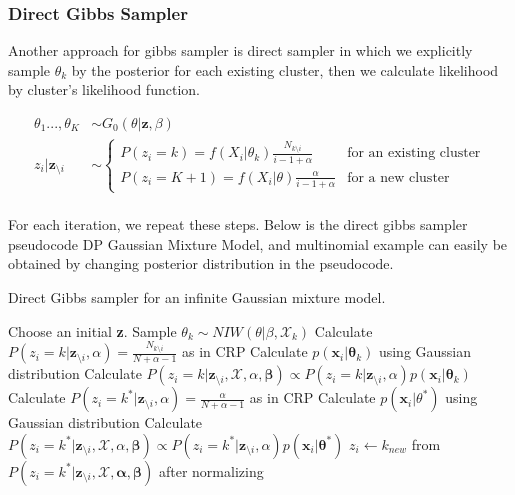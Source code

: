 \documentclass[a4paper]{article}
\begin{document}
\subsubsection{Direct Gibbs Sampler}

Another approach for gibbs sampler is direct sampler in which we
explicitly sample \(\theta_k\) by the posterior for each existing
cluster, then we calculate likelihood by cluster's likelihood function.

\begin{align*}
\theta_1...,\theta_K&\sim G_0(\theta|\boldsymbol z, \beta) \\
z_i|\boldsymbol z_{\setminus i} &\sim \begin{cases}
P(z_i=k)= f(X_i|\theta_{k})\frac{N_{k\setminus i}}{i-1+\alpha} & \text{for an existing cluster} \\
P(z_i=K+1)= f(X_i|\theta)\frac{\alpha}{i-1+\alpha} & \text{for a new cluster}
\end{cases}\\
\end{align*}

For each iteration, we repeat these steps. Below is the direct gibbs
sampler pseudocode DP Gaussian Mixture Model, and multinomial example
can easily be obtained by changing posterior distribution in the
pseudocode.


\begin{algorithm}
  \caption{Direct Gibbs sampler for an infinite Gaussian mixture model.}\label{directgibbs}
  \begin{algorithmic}[1]
    
  \State Choose an initial \textbf{z}.
   
     
            \State Sample $\theta_k \sim NIW(\theta|\beta,\mathcal{X}_{k})$ 
    \EndFor
         
            \State Calculate $P(z_i = k | \mathbf{z}_{\setminus i},\alpha) = \frac{N_{k\setminus i}}{N+\alpha-1}$ as in CRP
            \State Calculate $p(\mathbf{x}_i|\mathbf{\theta}_k)$ using Gaussian distribution
            \State Calculate $P(z_i = k | \mathbf{z}_{\setminus i},\mathcal{X},\alpha,\mathbf{\beta}) \propto P(z_i = k | \mathbf{z}_{\setminus i},\alpha)p(\mathbf{x}_i|\mathbf{\theta}_k)$
        \EndFor
        \State Calculate $P(z_i = k^* | \mathbf{z}_{\setminus i},\alpha) = \frac{\alpha}{N+\alpha-1}$ as in CRP 
        \State Calculate $p(\mathbf{x}_i|\theta^*)$ using Gaussian distribution
        \State Calculate $P(z_i = k^* | \mathbf{z}_{\setminus i},\mathcal{X},\alpha, \mathbf{\beta}) \propto P(z_i = k^* | \mathbf{z}_{\setminus i},\alpha)p(\mathbf{x}_i|\mathbf{\theta}^*)$
        \State $z_i \gets k_{new}$ from $P(z_i = k^* | \mathbf{z}_{\setminus i},\mathcal{X},\mathbf{\alpha},\mathbf{\beta})$ after normalizing
    \EndFor
  \EndFor
  \end{algorithmic}
\end{algorithm}
\end{document}
